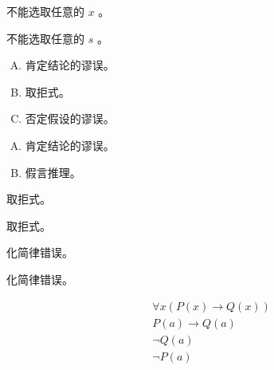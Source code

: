 {{        %
        \begin{practices}
            不能选取任意的 $x$ 。
        \end{practices}

        \begin{practices}
            不能选取任意的 $s$ 。
        \end{practices}

        \begin{practices}
            \begin{enumerate}[A.]
                \item 肯定结论的谬误。
                \item 取拒式。
                \item 否定假设的谬误。
            \end{enumerate}
        \end{practices}

        \begin{practices}
            \begin{enumerate}[A.]
                \item 肯定结论的谬误。
                \item 假言推理。
            \end{enumerate}
        \end{practices}

        \begin{practices}
            取拒式。
        \end{practices}

        \begin{practices}
            取拒式。
        \end{practices}

        \begin{practices}
            化简律错误。
        \end{practices}

        \begin{practices}
            化简律错误。
        \end{practices}

        \begin{practices}
            \begin{align*}
                &\forall x (P(x) \rightarrow Q(x)) \\
                &P(a) \rightarrow Q(a) \\
                &\neg Q(a) \\
                &\neg P(a)
            \end{align*}
        \end{practices}

}}
